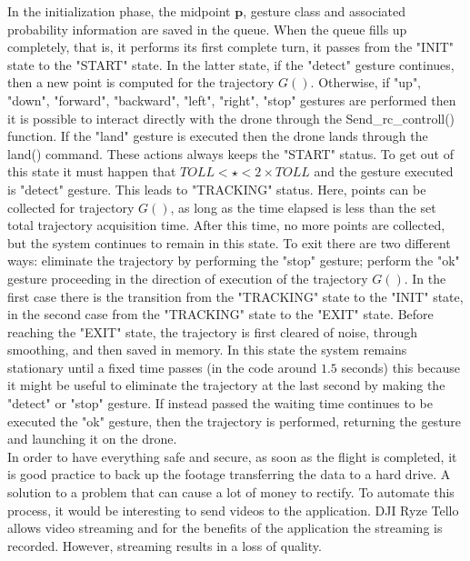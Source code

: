 \noindent In the initialization phase, the midpoint $\bm{p}$, gesture class and associated probability information are saved in the queue. When the queue fills up completely, that is, it performs its first complete turn, it passes from the "INIT" state to the "START" state. In the latter state, if the "detect" gesture continues, then a new point is computed for the trajectory $G()$. Otherwise, if "up", "down", "forward", "backward", "left", "right", "stop" gestures are performed then it is possible to interact directly with the drone through the Send\_rc\_controll() function. If the "land" gesture is executed then the drone lands through the land() command. These actions always keeps the "START" status. To get out of this state it must happen that $TOLL< \star < 2 \times TOLL$ and the gesture executed is "detect" gesture. This leads to "TRACKING" status. Here, points can be collected for trajectory $G()$, as long as the time elapsed is less than the set total trajectory acquisition time. After this time, no more points are collected, but the system continues to remain in this state. To exit there are two different ways: eliminate the trajectory by performing the "stop" gesture; perform the "ok" gesture proceeding in the direction of execution of the trajectory $G()$. In the first case there is the transition from the "TRACKING" state to the "INIT" state, in the second case from the "TRACKING" state to the "EXIT" state. Before reaching the "EXIT" state, the trajectory is first cleared of noise, through smoothing, and then saved in memory. In this state the system remains stationary until a fixed time passes (in the code around $1.5$ seconds) this because it might be useful to eliminate the trajectory at the last second by making the "detect" or "stop" gesture. If instead passed the waiting time continues to be executed the "ok" gesture, then the trajectory is performed, returning the gesture and launching it on the drone. \\

\noindent In order to have everything safe and secure, as soon as the flight is completed, it is good practice to back up the footage transferring the data to a hard drive. A solution to a problem that can cause a lot of money to rectify. To automate this process, it would be interesting to send videos to the application. DJI Ryze Tello allows video streaming and for the benefits of the application the streaming is recorded. However, streaming results in a loss of quality.